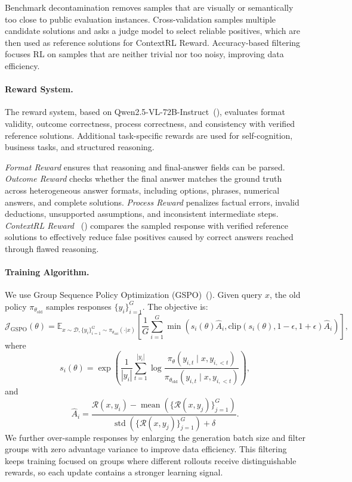 \documentclass{article} %
\begin{document}
Benchmark decontamination removes samples that are visually or semantically too close to public evaluation instances. Cross-validation samples multiple candidate solutions and asks a judge model to select reliable positives, which are then used as reference solutions for ContextRL Reward. Accuracy-based filtering focuses RL on samples that are neither trivial nor too noisy, improving data efficiency.

\paragraph{Reward System.}
The reward system, based on Qwen2.5-VL-72B-Instruct~(\cite{qwen2_5_vl}), evaluates format validity, outcome correctness, process correctness, and consistency with verified reference solutions. Additional task-specific rewards are used for self-cognition, business tasks, and structured reasoning.

\textit{Format Reward} ensures that reasoning and final-answer fields can be parsed. \textit{Outcome Reward} checks whether the final answer matches the ground truth across heterogeneous answer formats, including options, phrases, numerical answers, and complete solutions. \textit{Process Reward} penalizes factual errors, invalid deductions, unsupported assumptions, and inconsistent intermediate steps. \textit{ContextRL Reward} ~(\cite{lu2026contextrl}) compares the sampled response with verified reference solutions to effectively reduce false positives caused by correct answers reached through flawed reasoning.

\paragraph{Training Algorithm.}
We use Group Sequence Policy Optimization (GSPO)~(\cite{zheng2025gspo}). Given query $x$, the old policy $\pi_{\theta_{\mathrm{old}}}$ samples responses $\{y_i\}_{i=1}^{G}$. The objective is:
\begin{equation}
\mathcal{J}_{\mathrm{GSPO}}(\theta) =
\mathbb{E}_{x \sim \mathcal{D}, \{y_i\}_{i=1}^{G} \sim \pi_{\theta_{\mathrm{old}}}(\cdot | x)}
\left[
\frac{1}{G}
\sum_{i=1}^{G}
\min
\left(
s_i(\theta)\hat{A}_i,
\mathrm{clip}\left(s_i(\theta), 1-\epsilon, 1+\epsilon\right)\hat{A}_i
\right)
\right],
\end{equation}
where
\begin{equation}
s_i(\theta) =
\exp
\left(
\frac{1}{|y_i|}
\sum_{t=1}^{|y_i|}
\log
\frac{
\pi_{\theta}(y_{i,t}\mid x, y_{i,<t})
}{
\pi_{\theta_{\mathrm{old}}}(y_{i,t}\mid x, y_{i,<t})
}
\right),
\end{equation}
and
\begin{equation}
\hat{A}_i =
\frac{
\mathcal{R}(x, y_i) -
\operatorname{mean}\left(\{\mathcal{R}(x, y_j)\}_{j=1}^{G}\right)
}{
\operatorname{std}\left(\{\mathcal{R}(x, y_j)\}_{j=1}^{G}\right) + \delta
}.
\end{equation}
We further over-sample responses by enlarging the generation batch size and filter groups with zero advantage variance to improve data efficiency.
This filtering keeps training focused on groups where different rollouts receive distinguishable rewards, so each update contains a stronger learning signal.
\end{document}
